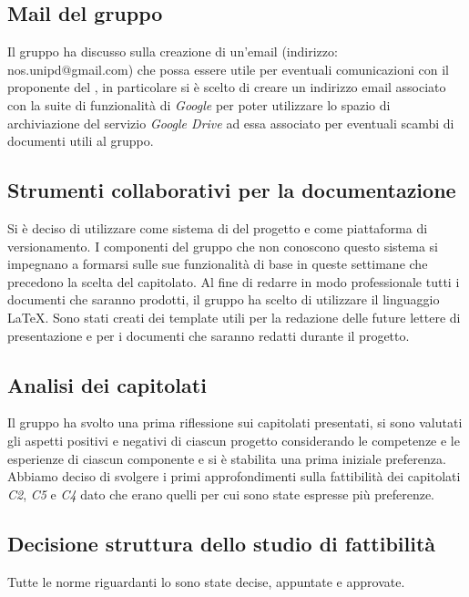\subsection{Mail del gruppo}
Il gruppo ha discusso sulla creazione di un'email (indirizzo: nos.unipd@gmail.com) che possa essere utile per eventuali comunicazioni con il proponente del , in particolare si è scelto di creare un indirizzo email associato con la suite di funzionalità di \textit{Google} per poter utilizzare lo spazio di archiviazione del servizio \textit{Google Drive} ad essa associato per eventuali scambi di documenti utili al gruppo.

\subsection{Strumenti collaborativi per la documentazione}
Si è deciso di utilizzare  come sistema di  del progetto e  come piattaforma di versionamento. I componenti del gruppo che non conoscono questo sistema si impegnano a formarsi sulle sue funzionalità di base in queste settimane che precedono la scelta del capitolato. Al fine di redarre in modo professionale tutti i documenti che saranno prodotti, il gruppo ha scelto di utilizzare il linguaggio \LaTeX . Sono stati creati dei template utili per la redazione delle future lettere di presentazione e per i documenti che saranno redatti durante il progetto.

\subsection{Analisi dei capitolati}
Il gruppo ha svolto una prima riflessione sui capitolati presentati, si sono valutati gli aspetti positivi e negativi di ciascun progetto considerando le competenze e le esperienze di ciascun componente e si è stabilita una prima iniziale preferenza.
Abbiamo deciso di svolgere i primi approfondimenti sulla fattibilità dei capitolati \textit{C2}, \textit{C5} e \textit{C4} dato che erano quelli per cui sono state espresse più preferenze.

\subsection{Decisione struttura dello studio di fattibilità}
Tutte le norme riguardanti lo \textit{\SdF} sono state decise, appuntate e approvate.

